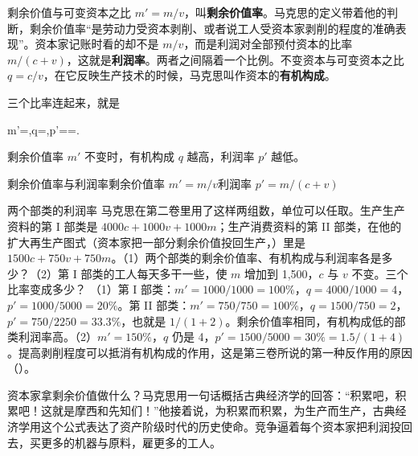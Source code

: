 剩余价值与可变资本之比 $m'=m/v$，叫\textbf{剩余价值率}。马克思的定义带着他的判断，剩余价值率“是劳动力受资本剥削、或者说工人受资本家剥削的程度的准确表现”\cite{marx1867}。资本家记账时看的却不是 $m/v$，而是利润对全部预付资本的比率 $m/(c+v)$，这就是\textbf{利润率}。两者之间隔着一个比例。不变资本与可变资本之比 $q=c/v$，在它反映生产技术的时候，马克思叫作资本的\textbf{有机构成}\cite{marx1887}。

三个比率连起来，就是
\begin{keyeq}
m'=,\qquad q=,\qquad p'==.\label{eq:marx-rates}
\end{keyeq}
剩余价值率 $m'$ 不变时，有机构成 $q$ 越高，利润率 $p'$ 越低。

\begin{compare}{剩余价值率与利润率}{剩余价值率 $m'=m/v$}{利润率 $p'=m/(c+v)$}
\end{compare}

\begin{example}{两个部类的利润率}\label{ex:marx-rates}
马克思在第二卷里用了这样两组数，单位可以任取。生产生产资料的第 I 部类是 $4000c+1000v+1000m$；生产消费资料的第 II 部类，在他的扩大再生产图式（资本家把一部分剩余价值投回生产，）里是 $1500c+750v+750m$\cite{marx1909k2}。（1）两个部类的剩余价值率、有机构成与利润率各是多少？（2）第 I 部类的工人每天多干一些，使 $m$ 增加到 1,500，$c$ 与 $v$ 不变。三个比率变成多少？
\solution （1）第 I 部类：$m'=1000/1000=100\%$，$q=4000/1000=4$，$p'=1000/5000=20\%$。第 II 部类：$m'=750/750=100\%$，$q=1500/750=2$，$p'=750/2250=33.3\%$，也就是 $1/(1+2)$。剩余价值率相同，有机构成低的部类利润率高。（2）$m'=150\%$，$q$ 仍是 4，$p'=1500/5000=30\%=1.5/(1+4)$。提高剥削程度可以抵消有机构成的作用，这是第三卷所说的第一种反作用的原因（）。
\end{example}

资本家拿剩余价值做什么？马克思用一句话概括古典经济学的回答：“积累吧，积累吧！这就是摩西和先知们！”\cite{marx1867}他接着说，为积累而积累，为生产而生产，古典经济学用这个公式表达了资产阶级时代的历史使命\cite{marx1867}。竞争逼着每个资本家把利润投回去，买更多的机器与原料，雇更多的工人。

